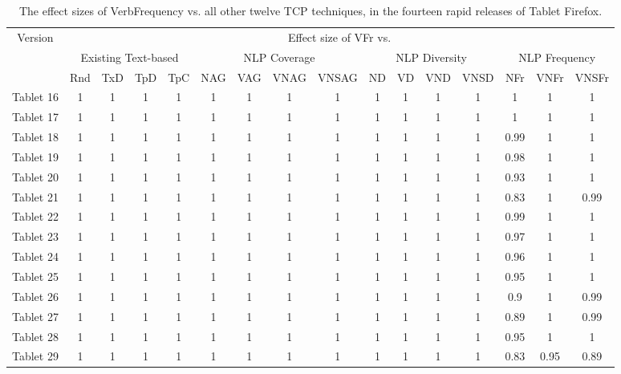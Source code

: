 \documentclass[conference]{IEEEtran}
\begin{document}
\begin{table*}[t!]
\centering
\caption{The effect sizes of VerbFrequency vs. all other twelve TCP techniques, in the fourteen rapid releases of Tablet Firefox.}
\label{table:8}
\begin{tabular}{ |c|c c c c|c c c c|c c c c|c c c|}
\hline
\multirow{3}{*}{Version} &
\multicolumn{15}{|c|}{Effect size of VFr vs.} \\
\cline{2-16}
\multicolumn{1}{|c}{} & 
\multicolumn{4}{|c}{Existing Text-based} & \multicolumn{4}{|c}{NLP Coverage}& \multicolumn{4}{|c}{NLP Diversity} &
\multicolumn{3}{|c|}{NLP Frequency}\\
\cline{2-16}
&    Rnd                 & TxD   & TpD   & TpC   & NAG          & VAG   & VNAG  & VNSAG & ND            & VD    & VND   & VNSD  & NFr           &  VNFr  & VNSFr \\
\hline
Tablet 16 & 1 & 1 & 1 & 1 & 1 & 1 & 1 & 1 & 1 & 1 & 1 & 1 & 1    & 1    & 1    \\
Tablet 17 & 1 & 1 & 1 & 1 & 1 & 1 & 1 & 1 & 1 & 1 & 1 & 1 & 1    & 1    & 1    \\
Tablet 18 & 1 & 1 & 1 & 1 & 1 & 1 & 1 & 1 & 1 & 1 & 1 & 1 & 0.99 & 1    & 1    \\
Tablet 19 & 1 & 1 & 1 & 1 & 1 & 1 & 1 & 1 & 1 & 1 & 1 & 1 & 0.98 & 1    & 1    \\
Tablet 20 & 1 & 1 & 1 & 1 & 1 & 1 & 1 & 1 & 1 & 1 & 1 & 1 & 0.93 & 1    & 1    \\
Tablet 21 & 1 & 1 & 1 & 1 & 1 & 1 & 1 & 1 & 1 & 1 & 1 & 1 & 0.83 & 1    & 0.99 \\
Tablet 22 & 1 & 1 & 1 & 1 & 1 & 1 & 1 & 1 & 1 & 1 & 1 & 1 & 0.99 & 1    & 1    \\
Tablet 23 & 1 & 1 & 1 & 1 & 1 & 1 & 1 & 1 & 1 & 1 & 1 & 1 & 0.97 & 1    & 1    \\
Tablet 24 & 1 & 1 & 1 & 1 & 1 & 1 & 1 & 1 & 1 & 1 & 1 & 1 & 0.96 & 1    & 1    \\
Tablet 25 & 1 & 1 & 1 & 1 & 1 & 1 & 1 & 1 & 1 & 1 & 1 & 1 & 0.95 & 1    & 1    \\
Tablet 26 & 1 & 1 & 1 & 1 & 1 & 1 & 1 & 1 & 1 & 1 & 1 & 1 & 0.9  & 1    & 0.99 \\
Tablet 27 & 1 & 1 & 1 & 1 & 1 & 1 & 1 & 1 & 1 & 1 & 1 & 1 & 0.89 & 1    & 0.99 \\
Tablet 28 & 1 & 1 & 1 & 1 & 1 & 1 & 1 & 1 & 1 & 1 & 1 & 1 & 0.95 & 1    & 1    \\
Tablet 29 & 1 & 1 & 1 & 1 & 1 & 1 & 1 & 1 & 1 & 1 & 1 & 1 & 0.83 & 0.95 & 0.89 \\
\hline
\end{tabular}
\end{table*}
\end{document}
